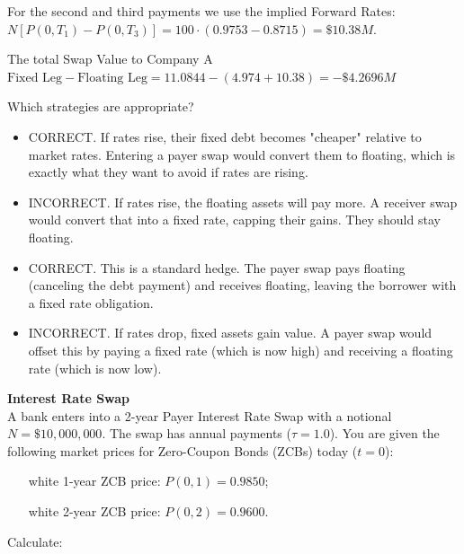 \documentclass[12pt,a4paper]{exam}
\begin{document}
\begin{questions}
\begin{solution}
For the second and third payments we use the implied Forward Rates: $N[P(0,T_1)-P(0,T_3)] = 100\cdot (0.9753-0.8715)=\$10.38M$.

The total Swap Value to Company A $\text{Fixed Leg}-\text{Floating Leg} = 11.0844-(4.974+10.38)=-\$4.2696 M$

Which strategies are appropriate?
\begin{itemize}
	\item CORRECT. If rates rise, their fixed debt becomes "cheaper" relative to market rates. Entering a payer swap would convert them to floating, which is exactly what they want to avoid if rates are rising.
	\item INCORRECT. If rates rise, the floating assets will pay more. A receiver swap would convert that into a fixed rate, capping their gains. They should stay floating.
	\item CORRECT. This is a standard hedge. The payer swap pays floating (canceling the debt payment) and receives floating, leaving the borrower with a fixed rate obligation.
	\item INCORRECT. If rates drop, fixed assets gain value. A payer swap would offset this by paying a fixed rate (which is now high) and receiving a floating rate (which is now low).
\end{itemize}
\end{solution}

\question \textbf{Interest Rate Swap} \\
A bank enters into a 2-year Payer Interest Rate Swap with a notional $N=\$10,000,000$. The swap has annual payments ($\tau =1.0$). You are given the following market prices for Zero-Coupon Bonds (ZCBs) today ($t=0$):
\begin{itemize}
	\item[white] 1-year ZCB price: $P(0,1)=0.9850$;
	\item[white] 2-year ZCB price: $P(0,2)=0.9600$.
\end{itemize}
Calculate:


\end{questions}
\end{document}
